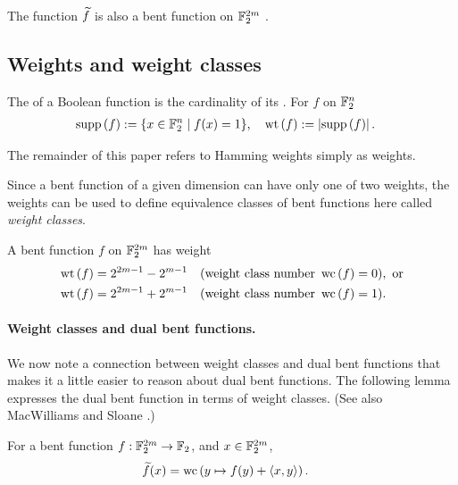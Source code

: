 \begin{Remark}
The function $\widetilde{f}$ is also a bent function on $\mathbb{F}_2^{2m}$ \cite[p. 427]{MacS77} \cite[p. 301]{Rot76}.
\end{Remark}

\subsection{Weights and weight classes}
\begin{Definition}
\label{def-weight}
The  of a Boolean function is the cardinality of its  \cite[p. 8]{MacS77}.
For $f$ on $\mathbb{F}_2^n$
\begin{align*}
\operatorname{supp}\left(f\right) &:= \{x \in \mathbb{F}_2^n \mid f(x)=1 \}, \quad \operatorname{wt}\left(f\right) := \left|  \operatorname{supp}\left(f\right)  \right|.
\end{align*}
\end{Definition}

The remainder of this paper refers to Hamming weights simply as weights.

Since a bent function of a given dimension can have only one of two weights,
the weights can be used to define equivalence classes of bent functions %
here called \emph{weight classes}.
\begin{Definition}
\label{def-weight-class}
A bent function $f$ on $\mathbb{F}_2^{2m}$ has weight \cite[Theorem 6.2.10]{Dil74}
\begin{align*}
\operatorname{wt}\left(f\right) &= 2^{2 m - 1} - 2^{m-1} \quad (\text{weight class number~} \operatorname{wc}\left(f\right)=0),
\text{~or}
\\
\operatorname{wt}\left(f\right) &= 2^{2 m - 1} + 2^{m-1} \quad (\text{weight class number~} \operatorname{wc}\left(f\right)=1).
\end{align*}
\end{Definition}

\paragraph*{Weight classes and dual bent functions.}

We now note a connection between weight classes and dual bent functions that
makes it a little easier to reason about dual bent functions.
The following lemma expresses the dual bent function in terms of weight classes.
(See also MacWilliams and Sloane \cite[p. 414]{MacS77}.)
\begin{Lemma}
\label{lm-notes-9b}
For a bent function $f : \mathbb{F}_2^{2m} \rightarrow \mathbb{F}_2$, and $x \in \mathbb{F}_2^{2m}$,
\begin{align*}
\widetilde{f}(x)
&=
\operatorname{wc}\left(y \mapsto f(y) + \langle x, y \rangle\right).
\end{align*}

\end{Lemma}

